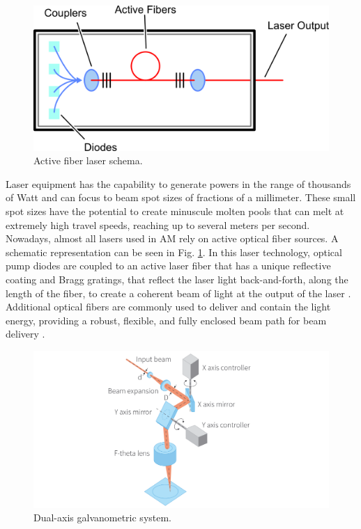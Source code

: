 \begin{figure}[H]
    \centering
    \includegraphics[scale=0.5]{Images/laser2.png}
    \caption[Laser schema.]{Active fiber laser schema.}
    \label{fig:laser}
\end{figure}
Laser equipment has the capability to generate powers in the range of thousands of Watt and can focus to beam spot sizes of fractions of a millimeter. These small spot sizes have the potential to create minuscule molten pools that can melt at extremely high travel speeds, reaching up to several meters per second. Nowadays, almost all lasers used in AM rely on active optical fiber sources. A schematic representation can be seen in Fig. \ref{fig:laser}. In this laser technology, optical pump diodes are coupled to an active laser fiber that has a unique reflective coating and Bragg gratings, that reflect the laser light back-and-forth, along the length of the fiber, to create a coherent beam of light at the output of the laser \cite{milewski_additive_2017}. Additional optical fibers are commonly used to deliver and contain the light energy, providing a robust, flexible, and fully enclosed beam path for beam delivery \cite{milewski_additive_2017}.
\begin{figure}[H]
    \centering
    \includegraphics[scale=0.5]{Images/galvanometro.png}
    \caption[Galvanometric system.]{Dual-axis galvanometric system.}
    \label{fig:galvano}
\end{figure}
